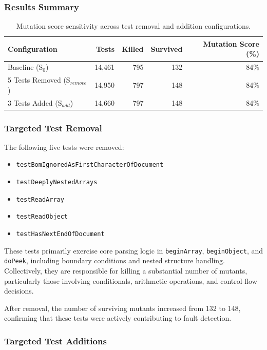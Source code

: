 \documentclass[11pt]{article}
\begin{document}
\subsubsection{Results Summary}

\begin{table}[H]
\centering
\small
\begin{tabular}{lrrrr}
\toprule
Configuration & Tests & Killed & Survived & Mutation Score (\%) \\
\midrule
Baseline (S$_0$) & 14,461 & 795 & 132 & 84\% \\
5 Tests Removed (S$_{remove}$) & 14,950 & 797 & 148 & 84\% \\
3 Tests Added (S$_{add}$) & 14,660 & 797 & 148 & 84\% \\
\bottomrule
\end{tabular}
\caption{Mutation score sensitivity across test removal and addition configurations.}
\end{table}

\subsubsection{Targeted Test Removal}

The following five tests were removed:

\begin{itemize}
\item \texttt{testBomIgnoredAsFirstCharacterOfDocument}
\item \texttt{testDeeplyNestedArrays}
\item \texttt{testReadArray}
\item \texttt{testReadObject}
\item \texttt{testHasNextEndOfDocument}
\end{itemize}

These tests primarily exercise core parsing logic in \texttt{beginArray}, \texttt{beginObject}, and \texttt{doPeek}, including boundary conditions and nested structure handling. Collectively, they are responsible for killing a substantial number of mutants, particularly those involving conditionals, arithmetic operations, and control-flow decisions.

After removal, the number of surviving mutants increased from 132 to 148, confirming that these tests were actively contributing to fault detection.

\subsubsection{Targeted Test Additions}
\end{document}
